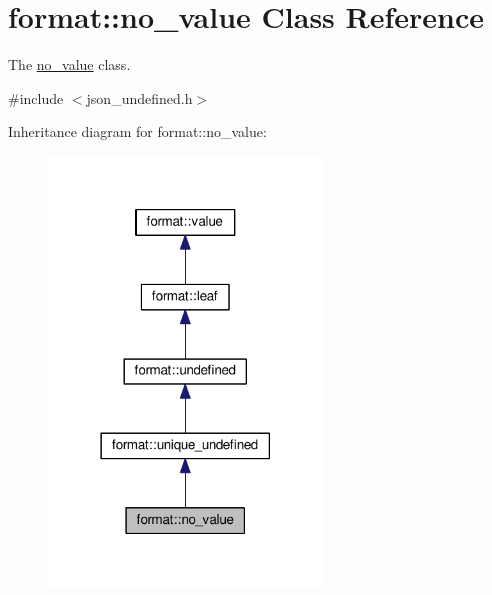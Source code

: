 \hypertarget{classformat_1_1no__value}{}\section{format\+:\+:no\+\_\+value Class Reference}
\label{classformat_1_1no__value}


The \hyperlink{classformat_1_1no__value}{no\+\_\+value} class.  




{\ttfamily \#include $<$json\+\_\+undefined.\+h$>$}



Inheritance diagram for format\+:\+:no\+\_\+value\+:
\nopagebreak
\begin{figure}[H]
\begin{center}
\leavevmode
\includegraphics[width=206pt]{classformat_1_1no__value__inherit__graph}
\end{center}
\end{figure}


